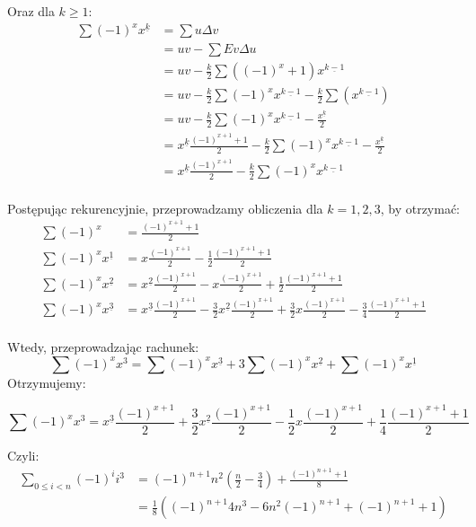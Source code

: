 \documentclass{article}
\newcommand{\desc}[2]{#1^{\underline{#2}}}
\begin{document}
Oraz dla $k \geqslant 1$:
\begin{align*}
\sum (-1)^x \desc{x}{k} &= \sum u \Delta v  \\
&= uv - \sum Ev \Delta u  \\
&= uv - \frac{k}{2} \sum ((-1)^x+1) \desc{x}{k-1} \\
&=uv - \frac{k}{2}\sum (-1)^x\desc{x}{k-1} - \frac{k}{2}\sum(\desc{x}{k-1}) \\
&=uv - \frac{k}{2}\sum (-1)^x\desc{x}{k-1} - \frac{\desc{x}{k}}{2} \\
&=\desc{x}{k}\frac{(-1)^{x+1}+1}{2} - \frac{k}{2}\sum (-1)^x\desc{x}{k-1} - \frac{\desc{x}{k}}{2}\\
&=\desc{x}{k} \frac{(-1)^{x+1}}{2} - \frac{k}{2}\sum (-1)^x\desc{x}{k-1}\\
\end{align*}

Postępując rekurencyjnie, przeprowadzamy obliczenia dla $k=1,2,3$, by otrzymać:
\begin{align*}
\sum (-1)^x &= \frac{(-1)^{x+1}+1}{2}\\
\sum (-1)^x \desc{x}{1} &= x\frac{(-1)^{x+1}}{2}-\frac{1}{2}\frac{(-1)^{x+1}+1}{2}\\
\sum (-1)^x \desc{x}{2} &= \desc{x}{2}\frac{(-1)^{x+1}}{2} - x\frac{(-1)^{x+1}}{2} + \frac{1}{2}\frac{(-1)^{x+1}+1}{2}\\
\sum (-1)^x \desc{x}{3} &=\desc{x}{3}\frac{(-1)^{x+1}}{2}-\frac{3}{2}\desc{x}{2}\frac{(-1)^{x+1}}{2}+\frac{3}{2}x\frac{(-1)^{x+1}}{2}-\frac{3}{4}\frac{(-1)^{x+1} + 1}{2}\\
\end{align*}

Wtedy, przeprowadzając rachunek:
\[\sum (-1)^x x^3 = \sum (-1)^x \desc{x}{3} + 3\sum (-1)^x \desc{x}{2} + \sum (-1)^x \desc{x}{1}\]
Otrzymujemy:

\[\sum (-1)^x x^3 = \desc{x}{3}\frac{(-1)^{x+1}}{2} + \frac{3}{2}\desc{x}{2}\frac{(-1)^{x+1}}{2} - \frac{1}{2}x\frac{(-1)^{x+1}}{2} + \frac{1}{4}\frac{(-1)^{x+1} + 1}{2}\]

Czyli:
\begin{align*}
\sum_{0 \leq i < n} (-1)^i i^3 &= (-1)^{n+1}n^2(\frac{n}{2}-\frac{3}{4}) + \frac{(-1)^{n+1}+1}{8} \\
&=\frac{1}{8}((-1)^{n+1}4n^3-6n^2(-1)^{n+1}+(-1)^{n+1}+1)
\end{align*}
\end{document}
